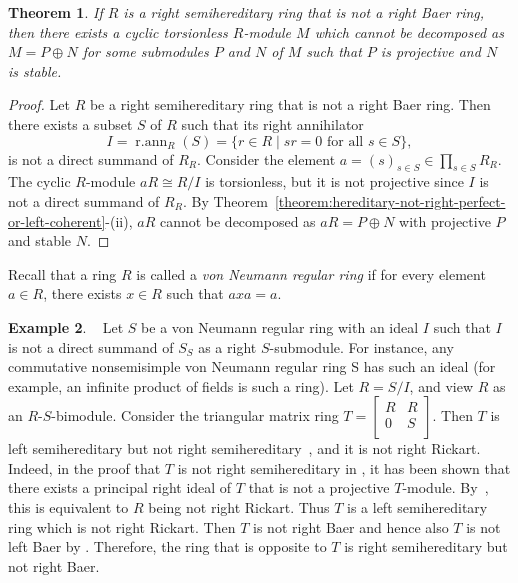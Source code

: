 \documentclass[11pt,a4paper]{amsart}
\theoremstyle{plain}
\newtheorem{theorem}{Theorem}[section]
\theoremstyle{definition}
\newtheorem{example}[theorem]{Example}
\theoremstyle{remark}
\newcommand{\rann}{\operatorname{r.ann}}
\begin{document}
\begin{theorem} \label{Ex:finitelygenerated torsionless} If $R$ is a right semihereditary ring that is not a right Baer ring, then there exists a cyclic torsionless $R$-module $M$ which cannot be decomposed as $M=P\oplus N$ for some submodules $P$ and $N$ of $M$ such that $P$ is projective and $N$ is stable.
\end{theorem}
\begin{proof}
Let $R$ be a right semihereditary ring that is not a right Baer ring. Then there exists a subset $S$ of $R$ such that its right annihilator \[I=\rann_{R}(S)=\{r \in R \mid sr=0\text{ for all } s \in S\},\] is not a direct summand of $R_R$. Consider the element $ a = (s)_{s \in S} \in \prod_{s \in S} R_R$. The cyclic $R$-module $a R \cong R/I $ is torsionless, but it is not projective since $ I $ is not a direct summand of $R_R$. By Theorem~\ref{theorem:hereditary-not-right-perfect-or-left-coherent}-(ii), $ aR $ cannot be decomposed as $aR = P \oplus N$ with  projective $P$ and  stable $N$.
\end{proof}

Recall that a ring $R$ is called a \emph{von Neumann regular ring} if for every element $a\in R$, there exists $x \in R $ such that $axa=a$.
\begin{example}~\cite[Chase's Example 2.34]{Lam:LecturesOnModulesAndRings} Let $ S $ be a von Neumann regular ring with an ideal $I$ such that $I$ is not a direct summand of $S_S$ as a right $ S $-submodule. {For instance, any commutative nonsemisimple von Neumann regular ring S has such an ideal (for example, an infinite product of fields is such a ring).} Let  $R=S/I$, and view $R$ as an $R\text{-}S$-bimodule. Consider the triangular matrix ring $T=\left[
\begin{array}{ll}
  R & R \\
  0 & S \\
\end{array}\right]$. Then $T$ is left semihereditary but not right semihereditary~{\cite[Example 2.34]{Lam:LecturesOnModulesAndRings}}, and it is not right Rickart. Indeed, in the proof that $T$ is not right semihereditary in \cite[Example 2.34]{Lam:LecturesOnModulesAndRings}, it has been shown that there exists a principal right ideal of $ T $ that is not a projective $ T $-module. By~\cite[Proposition 7.48]{Lam:LecturesOnModulesAndRings}, this is equivalent to $R$ being not right Rickart. Thus $T$ is a left semihereditary ring which is not right Rickart. Then $T$ is not right Baer and hence also $T$ is not left Baer by \cite[Proposition 7.46]{Lam:LecturesOnModulesAndRings}. {Therefore, the ring that is opposite to $T$ is right semihereditary but not right Baer.}
\end{example}
\end{document}
